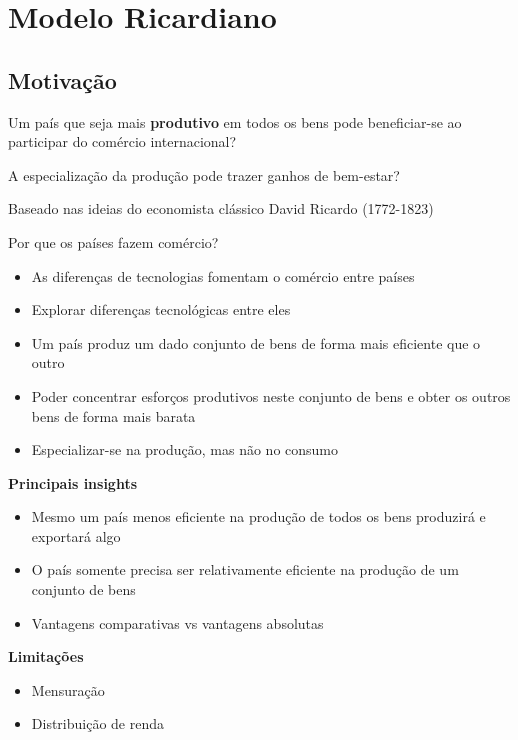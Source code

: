 \documentclass[a4paper,12pt]{article}[abntex2]
\begin{document}
\newpage

\section{\textbf{Modelo Ricardiano}}
\subsection{\textbf{Motivação}}
Um país que seja mais \textbf{produtivo} em todos os bens pode beneficiar-se ao participar do comércio internacional?

A especialização da produção pode trazer ganhos de bem-estar?

Baseado nas ideias do economista clássico David Ricardo (1772-1823)

Por que os países fazem comércio?\begin{itemize}
    \item As diferenças de tecnologias fomentam o comércio entre países 
    \item Explorar diferenças tecnológicas entre eles
    \item Um país produz um dado conjunto de bens de forma mais eficiente que o outro
    \item Poder concentrar esforços produtivos neste conjunto de bens e obter os outros bens de forma mais barata
    \item Especializar-se na produção, mas não no consumo
\end{itemize}

\textbf{Principais insights}\begin{itemize}
    \item Mesmo um país menos eficiente na produção de todos os bens produzirá e exportará algo
    \item O país somente precisa ser relativamente eficiente na produção de um conjunto de bens
    \item Vantagens comparativas vs vantagens absolutas
\end{itemize}

\textbf{Limitações}\begin{itemize}
    \item Mensuração
    \item Distribuição de renda 
\end{itemize}
\end{document}
